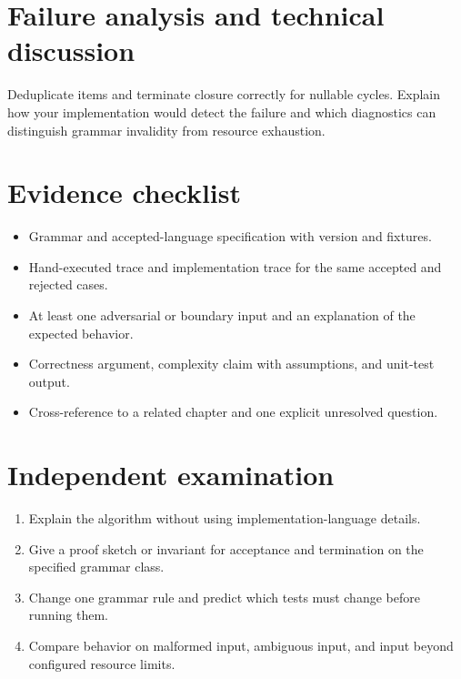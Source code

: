 \documentclass[11pt,letterpaper]{article}
\begin{document}
\section{Failure analysis and technical discussion}
Deduplicate items and terminate closure correctly for nullable cycles. Explain how your implementation would detect the failure and which diagnostics can distinguish grammar invalidity from resource exhaustion.
\section{Evidence checklist}
\begin{itemize}
\item Grammar and accepted-language specification with version and fixtures.
\item Hand-executed trace and implementation trace for the same accepted and rejected cases.
\item At least one adversarial or boundary input and an explanation of the expected behavior.
\item Correctness argument, complexity claim with assumptions, and unit-test output.
\item Cross-reference to a related chapter and one explicit unresolved question.
\end{itemize}
\section{Independent examination}
\begin{enumerate}
\item Explain the algorithm without using implementation-language details.
\item Give a proof sketch or invariant for acceptance and termination on the specified grammar class.
\item Change one grammar rule and predict which tests must change before running them.
\item Compare behavior on malformed input, ambiguous input, and input beyond configured resource limits.
\end{enumerate}
\end{document}

